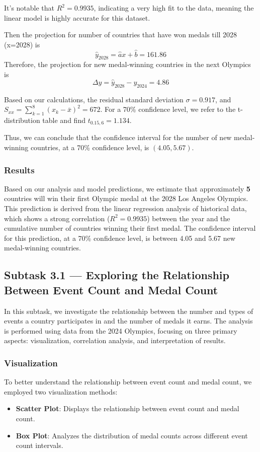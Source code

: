 \documentclass{mcmthesis}
\begin{document}
It's notable that $R^2=0.9935$, indicating a very high fit to the data, meaning the linear model is highly accurate for this dataset.

Then the projection for number of countries that have won medals till 2028 (x=2028) is
$$\hat{y}_{2028}=\hat{a}x+\hat{b}=161.86$$
Therefore, the projection for new medal-winning countries in the next Olympics is
$$\Delta y=\hat{y}_{2028}-y_{2024}=4.86$$


Based on our calculations, the residual standard deviation $\sigma = 0.917$, and $S_{xx} = \sum_{k=1}^{8}(x_k - \bar{x})^2 = 672$. For a 70\% confidence level, we refer to the t-distribution table and find $t_{0.15,6} = 1.134$.

Thus, we can conclude that the confidence interval for the number of new medal-winning countries, at a 70\% confidence level, is $(4.05, 5.67)$.


\subsubsection{Results}

Based on our analysis and model predictions, we estimate that approximately \textbf{5} countries will win their first Olympic medal at the 2028 Los Angeles Olympics. This prediction is derived from the linear regression analysis of historical data, which shows a strong correlation ($R^2 = 0.9935$) between the year and the cumulative number of countries winning their first medal. The confidence interval for this prediction, at a 70\% confidence level, is between 4.05 and 5.67 new medal-winning countries.


\subsection{Subtask 3.1 --- Exploring the Relationship Between Event Count and Medal Count}

In this subtask, we investigate the relationship between the number and types of events a country participates in and the number of medals it earns. The analysis is performed using data from the 2024 Olympics, focusing on three primary aspects: visualization, correlation analysis, and interpretation of results.

\subsubsection{Visualization}
To better understand the relationship between event count and medal count, we employed two visualization methods:
\begin{itemize}
    \item \textbf{Scatter Plot}: Displays the relationship between event count and medal count.
    \item \textbf{Box Plot}: Analyzes the distribution of medal counts across different event count intervals.
\end{itemize}
\end{document}
